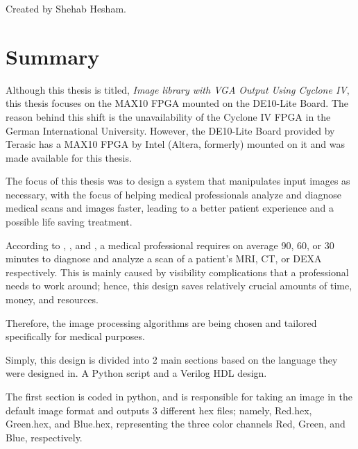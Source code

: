 	Created by Shehab Hesham.

\section{Summary}
\par Although this thesis is titled, \textit{Image library with VGA Output Using Cyclone IV}, this thesis focuses on the MAX10 FPGA mounted on the DE10-Lite Board. The reason behind this shift is the unavailability of the Cyclone IV FPGA in the German International University. However, the DE10-Lite Board provided by Terasic has a MAX10 FPGA by Intel (Altera, formerly) mounted on it and was made available for this thesis. \newline
\par The focus of this thesis was to design a system that manipulates input images as necessary, with the focus of helping medical professionals analyze and diagnose medical scans and images faster, leading to a better patient experience and a possible life saving treatment. \newline
\par According to \cite{MRI}, \cite{CT}, and \cite{DEXA}, a medical professional requires on average 90, 60, or 30 minutes to diagnose and analyze a scan of a patient's MRI, CT, or DEXA respectively. This is mainly caused by visibility complications that a professional needs to work around; hence, this design saves relatively crucial amounts of time, money, and resources. \newline
\par Therefore, the image processing algorithms are being chosen and tailored specifically for medical purposes. \newline
\par Simply, this design is divided into 2 main sections based on the language they were designed in. A Python script and a Verilog HDL design. \newline
\par The first section is coded in python, and is responsible for taking an image in the default image format and outputs	3 different hex files; namely, Red.hex, Green.hex, and Blue.hex, representing the three color channels Red, Green, and Blue, respectively. \newline
